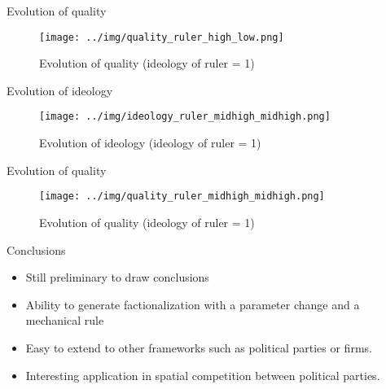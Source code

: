 \documentclass[9pt]{beamer}
\begin{document}
\begin{frame}{Evolution of quality}
  \begin{figure}[!h]
  \centering
  \caption{Evolution of quality}
  \texttt{[image: ../img/quality\_ruler\_high\_low.png]}
    \caption{Evolution of quality (ideology of ruler = 1)}
\end{figure}
\end{frame}

\begin{frame}{Evolution of ideology}
  \begin{figure}[!h]
  \centering
  \texttt{[image: ../img/ideology\_ruler\_midhigh\_midhigh.png]}
  \caption{Evolution of ideology (ideology of ruler = 1)}
\end{figure}
\end{frame}

\begin{frame}{Evolution of quality}
  \begin{figure}[!h]
    \centering
  \caption{Evolution of quality}
  \texttt{[image: ../img/quality\_ruler\_midhigh\_midhigh.png]}
    \caption{Evolution of quality (ideology of ruler = 1)}
\end{figure}
\end{frame}


\begin{frame}{Conclusions}
  \begin{itemize}
  \item Still preliminary to draw conclusions
  \item Ability to generate factionalization with a parameter change and a
    mechanical rule
  \item Easy to extend to other frameworks such as political parties or firms. 
  \item Interesting application in spatial competition between political
    parties. 
  \end{itemize}
\end{frame}
\end{document}
